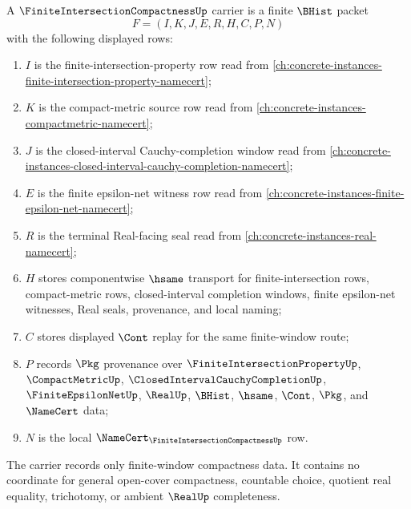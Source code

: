 \begin{definition}
\label{def:finite-intersection-compactness-carrier}
A $\FiniteIntersectionCompactnessUp$ carrier is a finite $\BHist$ packet
$$
F=(I,K,J,E,R,H,C,P,N)
$$
with the following displayed rows:
\begin{enumerate}
\item $I$ is the finite-intersection-property row read from \autoref{ch:concrete-instances-finite-intersection-property-namecert};
\item $K$ is the compact-metric source row read from \autoref{ch:concrete-instances-compactmetric-namecert};
\item $J$ is the closed-interval Cauchy-completion window read from \autoref{ch:concrete-instances-closed-interval-cauchy-completion-namecert};
\item $E$ is the finite epsilon-net witness row read from \autoref{ch:concrete-instances-finite-epsilon-net-namecert};
\item $R$ is the terminal Real-facing seal read from \autoref{ch:concrete-instances-real-namecert};
\item $H$ stores componentwise $\hsame$ transport for finite-intersection rows, compact-metric rows, closed-interval completion windows, finite epsilon-net witnesses, Real seals, provenance, and local naming;
\item $C$ stores displayed $\Cont$ replay for the same finite-window route;
\item $P$ records $\Pkg$ provenance over $\FiniteIntersectionPropertyUp$, $\CompactMetricUp$, $\ClosedIntervalCauchyCompletionUp$, $\FiniteEpsilonNetUp$, $\RealUp$, $\BHist$, $\hsame$, $\Cont$, $\Pkg$, and $\NameCert$ data;
\item $N$ is the local $\NameCert_{\FiniteIntersectionCompactnessUp}$ row.
\end{enumerate}
The carrier records only finite-window compactness data. It contains no coordinate for general open-cover compactness, countable choice, quotient real equality, trichotomy, or ambient $\RealUp$ completeness.
\end{definition}


